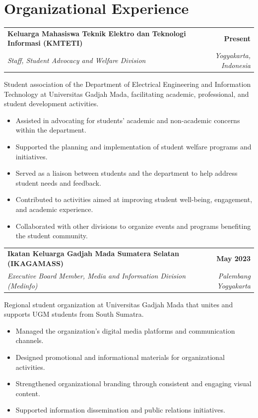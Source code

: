 \documentclass[a4paper,10pt]{article}
\makeatletter
\newcommand{\entry}[4]{%
  \begin{tabularx}{\linewidth}{@{}X r@{}}
    \textbf{#1} & \hspace{1em}\textbf{#4} \\
    \textit{#3} & \hspace{1em}\textit{\small #2} \\
  \end{tabularx}\par\vspace{1pt}%
}
\newcommand{\about}[1]{{\small\color{darkgray}#1}\par}
\newcommand{\entrygap}{\vspace{6pt}}
\makeatother
\begin{document}
\section{Organizational Experience}
\entry{Keluarga Mahasiswa Teknik Elektro dan Teknologi Informasi (KMTETI)}{Yogyakarta, Indonesia}
      {Staff, Student Advocacy and Welfare Division}{Present}
\about{Student association of the Department of Electrical Engineering and
Information Technology at Universitas Gadjah Mada, facilitating academic,
professional, and student development activities.}
\begin{itemize}
  \item Assisted in advocating for students' academic and non-academic concerns within the department.
  \item Supported the planning and implementation of student welfare programs and initiatives.
  \item Served as a liaison between students and the department to help address student needs and feedback.
  \item Contributed to activities aimed at improving student well-being, engagement, and academic experience.
  \item Collaborated with other divisions to organize events and programs benefiting the student community.
\end{itemize}
\entrygap

\entry{Ikatan Keluarga Gadjah Mada Sumatera Selatan (IKAGAMASS)}{Palembang \textendash{} Yogyakarta}
      {Executive Board Member, Media and Information Division (Medinfo)}{May 2023}
\about{Regional student organization at Universitas Gadjah Mada that unites and
supports UGM students from South Sumatra.}
\begin{itemize}
  \item Managed the organization's digital media platforms and communication channels.
  \item Designed promotional and informational materials for organizational activities.
  \item Strengthened organizational branding through consistent and engaging visual content.
  \item Supported information dissemination and public relations initiatives.
\end{itemize}
\end{document}
